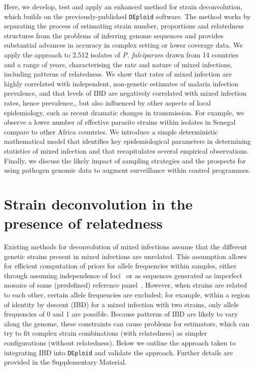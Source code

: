 \documentclass[9pt,lineno]{elife}
\begin{document}
Here, we develop, test and apply an enhanced method for strain deconvolution, which builds on the previously-published \texttt{DEploid} software.  The method works by separating the process of estimating strain number, proportions and relatedness structures from the problems of inferring genome sequences and provides substantial advances in accuracy in complex setting or lower coverage data.  We apply the approach to 2,512 isolates of {\it P. falciparum} drawn from 14 countries and a range of years, characterising the rate and nature of mixed infections, including patterns of relatedness.  We show that rates of mixed infection are highly correlated with independent, non-genetic estimates of malaria infection prevalence, and that levels of IBD are negatively correlated with mixed infection rates, hence prevalence,, but also influenced by other aspects of local epidemiology, such as recent dramatic changes in transmission. For example, we observe a lower number of effective parasite strains within isolates in Senegal compare to other Africa countries.  We introduce a simple deterministic mathematical model that identifies key epidemiological parameters in determining statistics of mixed infection and that recapitulates several empirical observations.  Finally, we discuss the likely impact of sampling strategies and the prospects for using pathogen genomic data to augment surveillance within control programmes.



\section{Strain deconvolution in the presence of relatedness}

Existing methods for deconvolution of mixed infections assume that the different genetic strains present in mixed infections are unrelated.  This assumption allows for efficient computation of priors for allele frequencies within samples, either through assuming independence of loci~\citep{Jack2016} or as sequences generated as imperfect mosaics of some (predefined) reference panel~\citep{Zhu2017}.  However, when strains are related to each other, certain allele frequencies are excluded; for example, within a region of identity by descent (IBD) for a mixed infection with two strains, only allele frequencies of 0 and 1 are possible.  Because patterns of IBD are likely to vary along the genome, these constraints can cause problems for estimators, which can try to fit complex strain combinations (with relatedness) as simpler configurations (without relatedness).  Below we outline the approach taken to integrating IBD into \texttt{DEploid} and validate the approach.  Further details are provided in the Supplementary Material.
\end{document}
